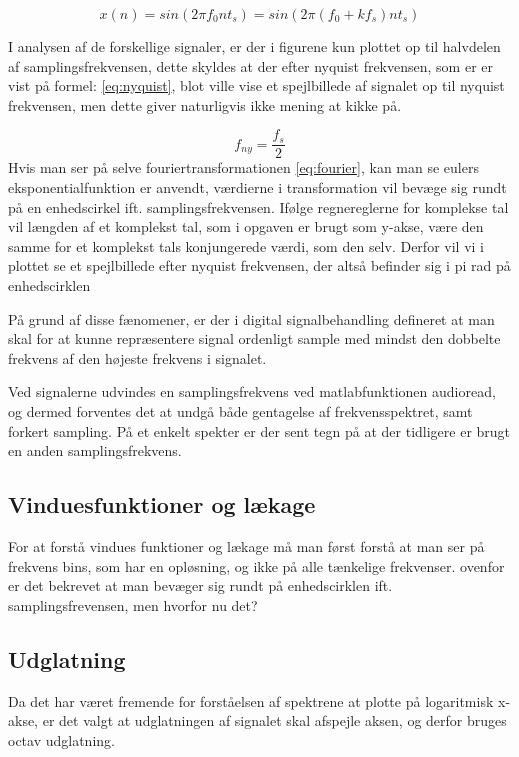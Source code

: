 \begin{equation}\label{eq:sinus1}
{x(n)} = sin(2\pi f_0 n t_s) =sin(2\pi (f_0+kf_s) n t_s) 
\end{equation}

  
I analysen af de forskellige signaler, er der i figurene kun plottet op til halvdelen af samplingsfrekvensen, dette skyldes at der efter nyquist frekvensen, som er er vist på formel: \eqref{eq:nyquist}, blot ville vise et spejlbillede af signalet op til nyquist frekvensen, men dette giver naturligvis ikke mening at kikke på.
 
  \begin{equation}\label{eq:nyquist}
  f_{ny} = \frac{f_s}{2} 
  \end{equation}
Hvis man ser på selve fouriertransformationen \eqref{eq:fourier}, kan man se eulers eksponentialfunktion er anvendt, værdierne i transformation vil bevæge sig rundt på en enhedscirkel ift. samplingsfrekvensen.  Ifølge regnereglerne for komplekse tal vil længden af et komplekst tal, som i opgaven er brugt som y-akse, være den samme for et komplekst tals konjungerede værdi, som den selv. Derfor vil vi i plottet se et spejlbillede efter nyquist frekvensen, der altså befinder sig i pi rad på enhedscirklen  
 
 På grund af disse fænomener, er der i digital signalbehandling defineret at man skal for at kunne repræsentere signal ordenligt sample med mindst den dobbelte frekvens af den højeste frekvens i signalet.
 
  Ved signalerne udvindes en samplingsfrekvens ved matlabfunktionen audioread, og dermed forventes det at undgå både gentagelse af frekvensspektret, samt forkert sampling. På et enkelt spekter er der sent tegn på at der tidligere er brugt en anden samplingsfrekvens.

\subsection{Vinduesfunktioner og lækage}
For at forstå vindues funktioner og lækage må man først forstå at man ser på frekvens bins, som har en opløsning, og ikke på alle tænkelige frekvenser. ovenfor er det bekrevet at man bevæger sig rundt på enhedscirklen ift. samplingsfrevensen, men hvorfor nu det? 



\subsection{Udglatning}

Da det har været fremende for forståelsen af spektrene at plotte på logaritmisk x-akse, er det valgt at udglatningen af signalet skal afspejle aksen, og derfor bruges octav udglatning.



